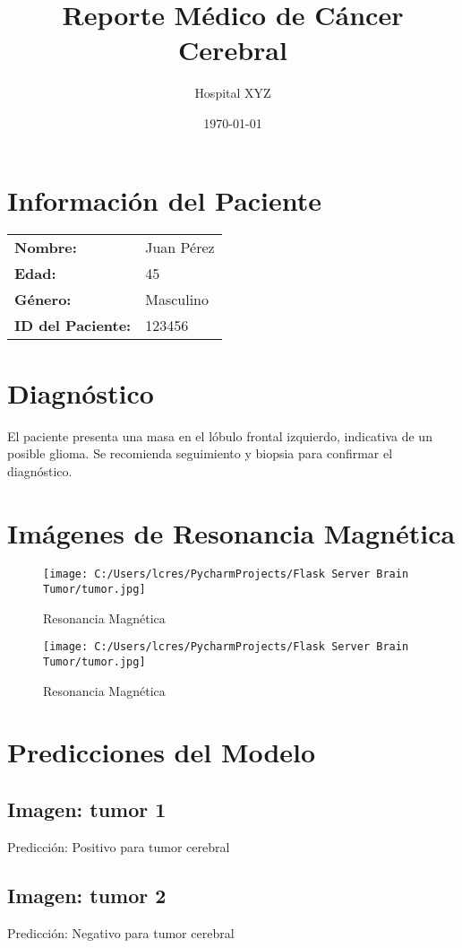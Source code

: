 \documentclass[12pt,a4paper]{article}%
\title{Reporte Médico de Cáncer Cerebral}%
\author{Hospital XYZ}%
\date{\today}%
\begin{document}
%
\normalsize%
\maketitle%
\newpage%
\section{Información del Paciente}%
\label{sec:InformacindelPaciente}%
\begin{tabular}{ll}%
\textbf{Nombre:}&Juan Pérez\\%
\textbf{Edad:}&45\\%
\textbf{Género:}&Masculino\\%
\textbf{ID del Paciente:}&123456\\%
\end{tabular}

%
\section{Diagnóstico}%
\label{sec:Diagnstico}%
El paciente presenta una masa en el lóbulo frontal izquierdo, indicativa de un posible glioma. Se recomienda seguimiento y biopsia para confirmar el diagnóstico.

%
\section{Imágenes de Resonancia Magnética}%
\label{sec:ImgenesdeResonanciaMagntica}%


\begin{figure}[h!]%
\centering%
\texttt{[image: C:/Users/lcres/PycharmProjects/Flask Server Brain Tumor/tumor.jpg]}%
\caption{Resonancia Magnética}%
\end{figure}

%


\begin{figure}[h!]%
\centering%
\texttt{[image: C:/Users/lcres/PycharmProjects/Flask Server Brain Tumor/tumor.jpg]}%
\caption{Resonancia Magnética}%
\end{figure}

%
\section{Predicciones del Modelo}%
\label{sec:PrediccionesdelModelo}%
\subsection{Imagen: tumor 1}%
\label{subsec:Imagentumor1}%
Predicción: Positivo para tumor cerebral

%
\subsection{Imagen: tumor 2}%
\label{subsec:Imagentumor2}%
Predicción: Negativo para tumor cerebral

%
\end{document}
